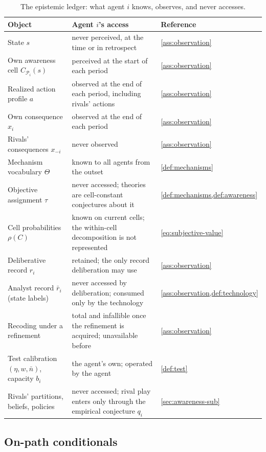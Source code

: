 \documentclass[11pt]{article}
\theoremstyle{definition}
\begin{document}
\begin{table}[t]
\centering
\caption{The epistemic ledger: what agent $i$ knows, observes, and never accesses.}
\label{tab:ledger}
\small
\begin{tabularx}{\textwidth}{@{}>{\raggedright\arraybackslash}p{3.6cm}>{\raggedright\arraybackslash}Xl@{}}
\toprule
Object & Agent $i$'s access & Reference\\
\midrule
State $s$ & never perceived, at the time or in retrospect & \cref{ass:observation}\\
Own awareness cell $C_{\mathcal P_i}(s)$ & perceived at the start of each period & \cref{ass:observation}\\
Realized action profile $a$ & observed at the end of each period, including rivals' actions & \cref{ass:observation}\\
Own consequence $x_i$ & observed at the end of each period & \cref{ass:observation}\\
Rivals' consequences $x_{-i}$ & never observed & \cref{ass:observation}\\
Mechanism vocabulary $\Theta$ & known to all agents from the outset & \cref{def:mechanisms}\\
Objective assignment $\tau$ & never accessed; theories are cell-constant conjectures about it & \cref{def:mechanisms,def:awareness}\\
Cell probabilities $\rho(C)$ & known on current cells; the within-cell decomposition is not represented & \cref{eq:subjective-value}\\
Deliberative record $r_i$ & retained; the only record deliberation may use & \cref{ass:observation}\\
Analyst record $\bar r_i$ (state labels) & never accessed by deliberation; consumed only by the technology & \cref{ass:observation,def:technology}\\
Recoding under a refinement & total and infallible once the refinement is acquired; unavailable before & \cref{ass:observation}\\
Test calibration $(\eta,w,\bar n)$, capacity $b_i$ & the agent's own; operated by the agent & \cref{def:test}\\
Rivals' partitions, beliefs, policies & never accessed; rival play enters only through the empirical conjecture $q_i$ & \cref{sec:awareness-sub}\\
\bottomrule
\end{tabularx}
\end{table}

\subsection{On-path conditionals}
\end{document}
